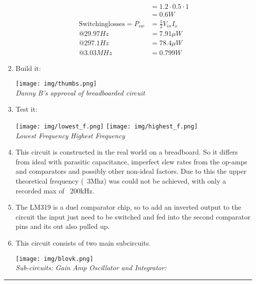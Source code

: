 \documentclass[11pt]{article}
\begin{document}
\begin{preview}
\begin{enumerate}
\begin{align*}
                                                                 &= 1.2{\cdot}0.5{\cdot}1\\
                                                                 &= 0.6W \\
                        \mathrm{Switching losses} = P_{sw} &= \frac{1}{2}V_{in}I_{o} \\
                                                      @29.97Hz &= 7.91\mu W \\
                                                      @297.1Hz &= 78.4\mu W \\
                                                      @3.03MHz &= 0.799W
                  \end{align*}
            \item Build it:
                  \begin{center}
                        \texttt{[image: img/thumbs.png]} \\
                        \textit{Danny B's approval of breadboarded circuit}
                  \end{center}
            \item Test it:
                  \begin{center}
                        \texttt{[image: img/lowest\_f.png]}
                        \texttt{[image: img/highest\_f.png]} \\
                        \textit{Lowest Frequency} \hspace*{0.15\textwidth} \textit{Highest Frequency}
                  \end{center}
            \item This circuit is constructed in the real world on a breadboard. So it differs from ideal with parasitic capacitance, imperfect slew rates from the op-amps and comparators and possibly other non-ideal factors. Due to this the upper theoretical frequency (~3Mhz) was could not be achieved, with only a recorded max of ~200kHz.
            \item The LM319 is a duel comparator chip, so to add an inverted output to the circuit the input just need to be switched and fed into the second comparator pins and its out also pulled up. 
            \item This circuit consists of two main subcircuits.
                  \begin{center}
                        \texttt{[image: img/blovk.png]} \\
                        \textit{Sub-circuits: Gain Amp Oscillator and Integrator:}
                  \end{center}
      \end{enumerate}
      \hrule
\end{preview}
\end{document}
